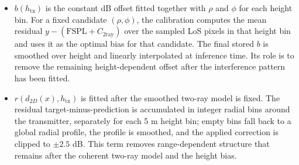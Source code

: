 \begin{itemize}
      FSPL; a positive value means a fading loss.
\item \(b(h_{\mathrm{tx}})\) is the constant dB offset fitted together with
      \(\rho\) and \(\phi\) for each height bin. For a fixed candidate
      \((\rho,\phi)\), the calibration computes the mean residual
      \(y-(\mathrm{FSPL}+C_{\mathrm{2ray}})\) over the sampled LoS pixels in
      that height bin and uses it as the optimal bias for that candidate. The
      final stored \(b\) is smoothed over height and linearly interpolated at
      inference time. Its role is to remove the remaining height-dependent
      offset after the interference pattern has been fitted.
\item \(r(d_{2D}(x),h_{\mathrm{tx}})\) is fitted after the smoothed two-ray
      model is fixed. The residual target-minus-prediction is accumulated in
      integer radial bins around the transmitter, separately for each
      5 m height bin; empty bins fall back to a global radial profile, the
      profile is smoothed, and the applied correction is clipped to
      \(\pm2.5\) dB. This term removes range-dependent structure that remains
      after the coherent two-ray model and the height bias.
\end{itemize}


